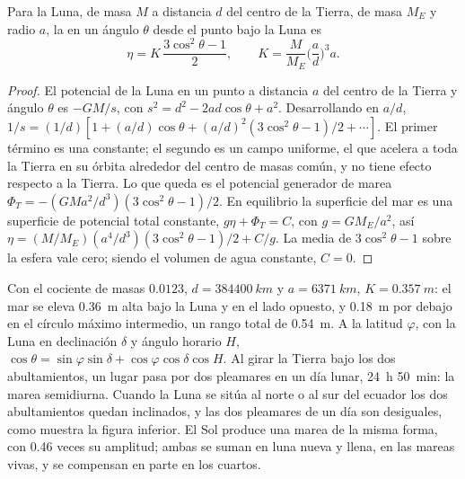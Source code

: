 \begin{theorem}\label{thm:b3:ocean-dynamics:equilibrium-tide}
Para la Luna, de masa $M$ a distancia $d$ del centro de la Tierra, de
masa $M_E$ y radio $a$, la  en un ángulo $\theta$ desde
el punto bajo la Luna es
\[
\eta = K\,\frac{3\cos^2\theta - 1}{2},\qquad
K = \frac{M}{M_E}\Big(\frac{a}{d}\Big)^3 a .
\]
\end{theorem}

\begin{proof}
El potencial de la Luna en un punto a distancia $a$ del centro de la Tierra
y ángulo $\theta$ es $-GM/s$, con $s^2 = d^2 - 2ad\cos\theta +
a^2$. Desarrollando en $a/d$, $1/s = (1/d)[1 + (a/d)\cos\theta + (a/d)^2
(3\cos^2\theta - 1)/2 + \cdots]$. El primer término es una constante; el segundo
es un campo uniforme, el que acelera a toda la Tierra en su órbita
alrededor del centro de masas común, y no tiene efecto respecto a la Tierra.
Lo que queda es el potencial generador de marea $\Phi_T = -(GMa^2/d^3)(3
\cos^2\theta - 1)/2$. En equilibrio la superficie del mar es una superficie de
potencial total constante, $g\eta + \Phi_T = C$, con $g = GM_E/a^2$, así
$\eta = (M/M_E)(a^4/d^3)(3\cos^2\theta - 1)/2 + C/g$. La media de
$3\cos^2\theta - 1$ sobre la esfera vale cero; siendo el volumen de agua
constante, $C = 0$.
\end{proof}

Con el cociente de masas $0.0123$, $d = \qty{384400}{km}$ y $a =
\qty{6371}{km}$, $K = \qty{0.357}{m}$: el mar se eleva \qty{0.36}{m}
alta bajo la Luna y en el lado opuesto, y \qty{0.18}{m} por debajo en el
círculo máximo intermedio, un rango total de \qty{0.54}{m}. A la latitud $\varphi$, con
la Luna en declinación $\delta$ y ángulo horario $H$, $\cos\theta =
\sin\varphi\sin\delta + \cos\varphi\cos\delta\cos H$. Al girar la Tierra
bajo los dos abultamientos, un lugar pasa por dos pleamares en un día lunar,
\qty{24}{h} \qty{50}{min}: la marea semidiurna. Cuando la Luna se sitúa
al norte o al sur del ecuador los dos abultamientos quedan inclinados, y las dos pleamares
de un día son desiguales, como muestra la figura inferior. El Sol produce una
marea de la misma forma, con \num{0.46} veces su amplitud; ambas se suman en luna nueva y
llena, en las mareas vivas, y se compensan en parte en los cuartos.

